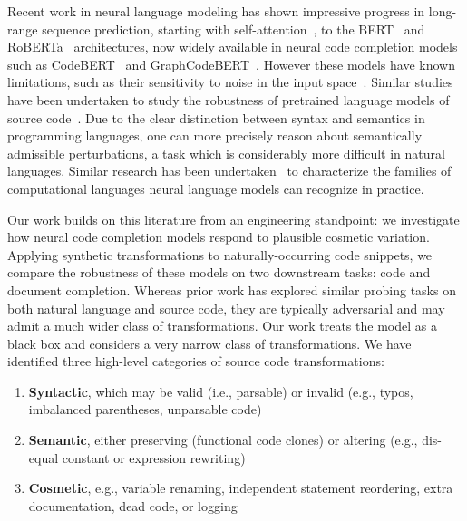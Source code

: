 \documentclass[usenames,dvipsnames]{article} %
\begin{document}
  Recent work in neural language modeling has shown impressive progress in long-range sequence prediction, starting with self-attention~\citep{vaswani2017attention}, to the BERT~\citep{devlin2018bert} and RoBERTa~\citep{liu2019roberta} architectures, now widely available in neural code completion models such as CodeBERT~\citep{feng2020codebert} and GraphCodeBERT~\citep{guo2021graphcodebert}. However these models have known limitations, such as their sensitivity to noise in the input space~\cite{sun2020adv}. Similar studies have been undertaken to study the robustness of pretrained language models of source code~\citep{bielik2020adversarial, zhou2021adversarial}. Due to the clear distinction between syntax and semantics in programming languages, one can more precisely reason about semantically admissible perturbations, a task which is considerably more difficult in natural languages. Similar research has been undertaken~\citep{weiss2018practical, chirkova2020empirical, chen2021evaluating} to characterize the families of computational languages neural language models can recognize in practice.

  Our work builds on this literature from an engineering standpoint: we investigate how neural code completion models respond to plausible cosmetic variation. Applying synthetic transformations to naturally-occurring code snippets, we compare the robustness of these models on two downstream tasks: code and document completion. Whereas prior work has explored similar probing tasks on both natural language and source code, they are typically adversarial and may admit a much wider class of transformations. Our work treats the model as a black box and considers a very narrow class of transformations. We have identified three high-level categories of source code transformations:

  \begin{enumerate}[itemsep=1ex]
    \item \textbf{Syntactic}, which may be valid (i.e., parsable) or invalid (e.g., typos, imbalanced parentheses, unparsable code)
    \item \textbf{Semantic}, either preserving (functional code clones) or altering (e.g., dis-equal constant or expression rewriting)
    \item \textbf{Cosmetic}, e.g., variable renaming, independent statement reordering, extra documentation, dead code, or logging
  \end{enumerate}
\end{document}
